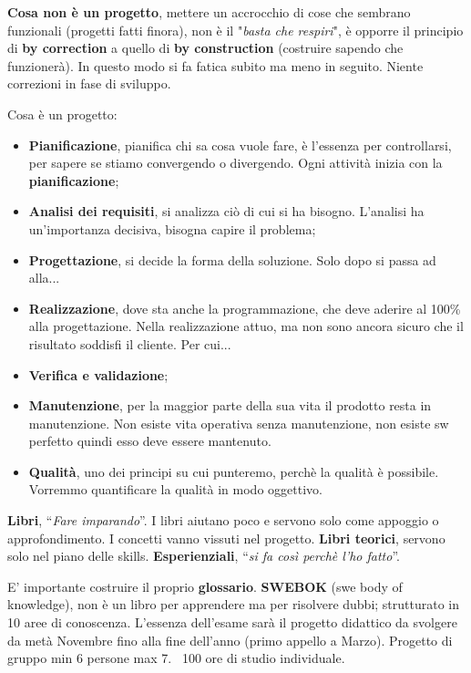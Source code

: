\textbf{Cosa non è un progetto}, mettere un accrocchio di cose che sembrano funzionali (progetti fatti finora), non è il "\textit{basta che respiri}", è opporre  il principio di \textbf{by correction} a quello di \textbf{by construction} (costruire sapendo che funzionerà). In questo modo si fa fatica subito ma meno in seguito. Niente correzioni in fase di sviluppo.

Cosa è un progetto:

\begin{itemize}

	\item \textbf{Pianificazione}, pianifica chi sa cosa vuole fare, è l'essenza per controllarsi, per sapere se stiamo convergendo o divergendo. Ogni attività inizia con la \textbf{pianificazione};
	\item \textbf{Analisi dei requisiti}, si analizza ciò di cui si ha bisogno. L'analisi ha un'importanza decisiva, bisogna capire il problema;
	\item \textbf{Progettazione}, si decide la forma della soluzione. Solo dopo si passa ad alla...
	\item \textbf{Realizzazione}, dove sta anche la programmazione, che deve aderire al 100\% alla progettazione. Nella realizzazione attuo, ma non sono ancora sicuro che il risultato soddisfi il cliente. Per cui...
	\item \textbf{Verifica e validazione};
	\item \textbf{Manutenzione}, per la maggior parte della sua vita il prodotto resta in manutenzione. Non esiste vita operativa senza manutenzione, non esiste sw perfetto quindi esso deve essere mantenuto.
	\item \textbf{Qualità}, uno dei principi su cui punteremo, perchè la qualità è possibile. Vorremmo quantificare la qualità in modo oggettivo.

\end{itemize}

\textbf{Libri}, “\textit{Fare imparando}”. I libri aiutano poco e servono solo come appoggio o approfondimento. I concetti vanno vissuti nel progetto.
\textbf{Libri teorici}, servono solo nel piano delle skills.
\textbf{Esperienziali}, “\textit{si fa così perchè l'ho fatto}”.

E' importante costruire il proprio \textbf{glossario}. \textbf{SWEBOK} (swe body of knowledge), non è un libro per apprendere ma per risolvere dubbi; strutturato in 10 aree di conoscenza. L'essenza dell'esame sarà il progetto didattico da svolgere da metà Novembre fino alla fine dell'anno (primo appello a Marzo). Progetto di gruppo min 6 persone max 7. ~100 ore di studio individuale.

